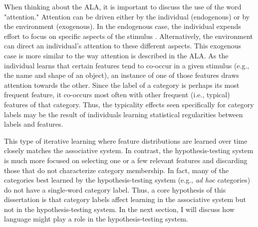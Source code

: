 \documentclass[../dissertation.tex]{subfiles}
\begin{document}
	When thinking about the ALA, it is important to discuss the use of the word "attention." Attention can be driven either by the individual (endogenous) or by the environment (exogenous). In the endogenous case, the individual expends effort to focus on specific aspects of the stimulus \citep{Engle2004}. Alternatively, the environment can direct an individual's attention to these different aspects. This exogenous case is more similar to the way attention is described in the ALA. As the individual learns that certain features tend to co-occur in a given stimulus (e.g., the name and shape of an object), an instance of one of those features draws attention towards the other. Since the label of a category is perhaps its most frequent feature, it co-occurs most often with other frequent (i.e., typical) features of that category. Thus, the typicality effects seen specifically for category labels may be the result of individuals learning statistical regularities between labels and features. \par
	This type of iterative learning where feature distributions are learned over time closely matches the associative system. In contrast, the hypothesis-testing system is much more focused on selecting one or a few relevant features and discarding those that do not characterize category membership. In fact, many of the categories best learned by the hypothesis-testing system (e.g., \textit{ad hoc} categories) do not have a single-word category label. Thus, a core hypothesis of this dissertation is that category labels affect learning in the associative system but not in the hypothesis-testing system. In the next section, I will discuss how language might play a role in the hypothesis-testing system. 
	
\end{document}
